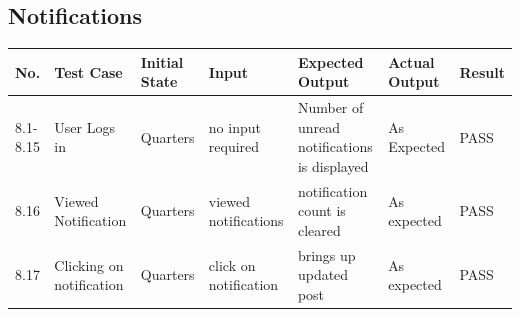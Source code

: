 \documentclass[12pt]{article}
\begin{document}
\subsection{Notifications}
\begin{longtable}{|p{1.5cm}|p{1.5cm}|p{1.5cm}|p{2cm}|p{4cm}|p{2cm}|p{1.5cm}|}
\hline
\textbf{No.} & \textbf{Test Case}  & \textbf{Initial State} & \textbf{Input} & \textbf{Expected Output} & \textbf{Actual Output} & \textbf{Result}\\ 
\hline
8.1-8.15 & User Logs in & Quarters & no input required & Number of unread notifications is displayed & As Expected & PASS \\ 
\hline
8.16 & Viewed Notification & Quarters & viewed notifications & notification count is cleared & As expected & PASS\\
\hline
8.17 & Clicking on notification & Quarters & click on notification & brings up updated post & As expected & PASS\\
\hline
\end{longtable}

\end{document}
